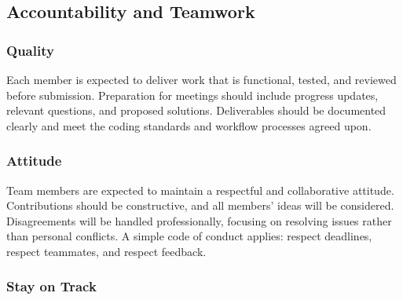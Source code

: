 \documentclass{article}
\begin{document}
\subsection*{Accountability and Teamwork}

\subsubsection*{Quality} 
Each member is expected to deliver work that is functional, tested, and reviewed before submission. 
Preparation for meetings should include progress updates, relevant questions, and proposed solutions. 
Deliverables should be documented clearly and meet the coding standards and workflow processes agreed upon.


\subsubsection*{Attitude}

Team members are expected to maintain a respectful and collaborative attitude. Contributions 
should be constructive, and all members' ideas will be considered. Disagreements will be handled 
professionally, focusing on resolving issues rather than personal conflicts. A simple code of conduct 
applies: respect deadlines, respect teammates, and respect feedback.


\subsubsection*{Stay on Track}


\end{document}
